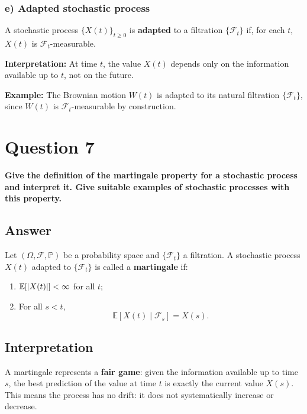 \documentclass[12pt,a4paper]{book}
\theoremstyle{remark}
\newcommand{\PP}{\mathbb{P}}          %
\newcommand{\EE}{\mathbb{E}}          %
\newcommand{\F}{\mathcal{F}}          %
\newcommand{\Filtr}[1]{\{\mathcal{F}_{#1}\}} %
\DeclarePairedDelimiter{\abs}{\lvert}{\rvert} %
\begin{document}
\subsubsection*{e) Adapted stochastic process}
A stochastic process $\{X(t)\}_{t\ge0}$ is \textbf{adapted} to a filtration $\{\F_t\}$ if, for each $t$, $X(t)$ is $\F_t$-measurable.

\textbf{Interpretation:} At time $t$, the value $X(t)$ depends only on the information available up to $t$, not on the future.  

\textbf{Example:} The Brownian motion $W(t)$ is adapted to its natural filtration $\{\F_t\}$, since $W(t)$ is $\F_t$-measurable by construction.













\newpage
\section{Question 7}
\textbf{Give the definition of the martingale property for a stochastic process and interpret it. Give suitable examples of stochastic processes with this property.}

\subsection*{Answer}
Let $(\Omega, \F, \PP)$ be a probability space and $\Filtr{t}$ a filtration. A stochastic process $X(t)$ adapted to $\Filtr{t}$ is called a \textbf{martingale} if:

\begin{enumerate}[label=\roman*)]
    \item $\EE[\abs{X(t)}] < \infty$ for all $t$;
    \item For all $s < t$, 
    \[
        \EE[X(t) \mid \F_s] = X(s).
    \]
\end{enumerate}

\subsection*{Interpretation}
A martingale represents a \textbf{fair game}: given the information available up to time $s$, the best prediction of the value at time $t$ is exactly the current value $X(s)$. This means the process has no drift: it does not systematically increase or decrease.
\end{document}
